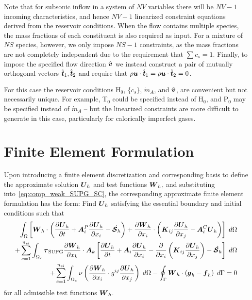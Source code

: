 Note that for subsonic inflow in a system of $NV$ variables there will be $NV-1$ incoming characteristics, and hence $NV-1$ linearized constraint equations derived from the reservoir conditions.  When the flow contains multiple species, the mass fractions of each constituent is also required as input. For a mixture of $NS$ species, however, we only impose $NS-1$ constraints, as the mass fractions are not completely independent due to the requirement that $\sum c_s = 1$. Finally, to impose the specified flow direction $\hat{{\boldsymbol{v}}}$ we instead construct a pair of mutually orthogonal vectors $\hat{{\boldsymbol{t}}}_1,\hat{{\boldsymbol{t}}}_2$ and require that $\rho{\boldsymbol{u}}\cdot\hat{{\boldsymbol{t}}}_1 = \rho{\boldsymbol{u}}\cdot\hat{{\boldsymbol{t}}}_2 = 0$.

For this case the reservoir conditions H$_0$, $\{c_s\}$, $\dot{m}_A$, and $\hat{{\boldsymbol{v}}}$, are convenient but not necessarily unique.  For example, T$_0$ could be specified instead of H$_0$, and P$_0$ may be specified instead of $\dot{m}_A$ -- but the linearized constraints are more difficult to generate in this case, particularly for calorically imperfect gases.

\section{Finite Element Formulation\label{sect:comp_fe_formulation}}
Upon introducing a finite element discretization and corresponding basis to define the approximate solution ${\boldsymbol{U}}_h$ and test functions ${\boldsymbol{W}}_h$, and substituting into~\eqref{eq:comp_weak_SUPG_SC}, the corresponding approximate finite element formulation has the form:  Find ${\boldsymbol{U}}_h$ satisfying the essential boundary and initial conditions such that
\begin{eqnarray}
  \label{eq:comp_fe_SUPG_SC}
  \int_\Omega  \left[ {\boldsymbol{W}}_h\cdot\left({\frac{\partial{{\boldsymbol{U}}_h}}{\partial{t}}} + {\boldsymbol{A}}^P_i {\frac{\partial{{\boldsymbol{U}}_h}}{\partial{x_i}}} - \dot{{\boldsymbol{\mathcal{S}}}_h} \right) + {\frac{\partial{{\boldsymbol{W}}_h}}{\partial{x_i}}} \cdot \left( {\boldsymbol{K}}_{ij} {\frac{\partial{{\boldsymbol{U}}_h}}{\partial{x_j}}} - {\boldsymbol{A}}^C_i {\boldsymbol{U}}_h\right)\right] \; d\Omega \nonumber \\
  + \sum_{e=1}^{n_{el}} \int_{\Omega_e} {\boldsymbol{\tau}}_{\text{SUPG}} {\frac{\partial{{\boldsymbol{W}}_h}}{\partial{x_k}}}\cdot{\boldsymbol{A}}_k
  \left[ {\frac{\partial{{\boldsymbol{U}}_h}}{\partial{t}}} + {\boldsymbol{A}}_i {\frac{\partial{{\boldsymbol{U}}_h}}{\partial{x_i}}} - {\frac{\partial{}}{\partial{x_i}}} \left( {\boldsymbol{K}}_{ij} {\frac{\partial{{\boldsymbol{U}}_h}}{\partial{x_j}}} \right) - \dot{{\boldsymbol{\mathcal{S}}}_h} \right] \; d\Omega  \nonumber \\
  + \sum_{e=1}^{n_{el}} \int_{\Omega_e} \nu \left({\frac{\partial{{\boldsymbol{W}}_h}}{\partial{x_i}}}\cdot g^{ij} {\frac{\partial{{\boldsymbol{U}}_h}}{\partial{x_j}}}\right)\; d\Omega
   -\oint_\Gamma {\boldsymbol{W}}_h\cdot\left({\boldsymbol{g}}_h - {\boldsymbol{f}}_h\right) \; d\Gamma = 0
\end{eqnarray}
for all admissible test functions ${\boldsymbol{W}}_h$.

